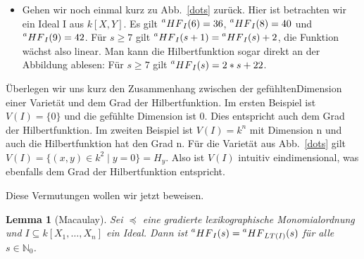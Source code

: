 \documentclass{article}
\newtheorem{lemma}[satz]{Lemma}
\newcommand*{\R}{k[X_{1},\ldots,X_{n}]}
\begin{document}
\begin{itemize}
\begin{proof}[Beweis]
	Damit folgt die Behauptung nach dem Induktionsprinzip.
	\end{proof}
	
	Sei nun \(I = \{0\}\). Dann ist mit Satz~\ref{1.2.8} und dem Theorem aus der Kombinatorik
		\begin{align*}
			\prescript{a}{}{HF}_{I}(s) &= dim_{k}(\R_{\leq s}/I_{\leq s}) \\
			&= dim_{k}(\R_{\leq s}) \\
			&= |\{ X^{\alpha} \in \R\, |\; deg(X^{\alpha}) \leq s\}| \\
			&= |\{ \alpha \in \mathbb{N}^{n}_{0}\, |\; |\alpha| \leq s\}| = |M_{n,s}| \\
			&= \binom{s+n}{s} = \binom{s+n}{n} \\
			&= \frac{1}{n!}(s+n)(s+n-1)\cdots (s+1) \\
			&= \frac{1}{n!}s^{n} + \frac{1}{n!}\binom{n+1}{2}s^{n-1} + \cdots + 1. \\
		\end{align*}
	\item Gehen wir noch einmal kurz zu Abb.~\ref{dots} zurück. Hier ist betrachten wir ein 
	Ideal I aus \(k[X,Y]\). Es gilt \(\prescript{a}{}{HF}_{I}(6) = 36\),
	\(\prescript{a}{}{HF}_{I}(8) = 40\) und \(\prescript{a}{}{HF}_{I}(9) = 42\).
	Für \(s \geq 7\) gilt \(\prescript{a}{}{HF}_{I}(s+1) = \prescript{a}{}{HF}_{I}(s) + 2\),
	die Funktion wächst also linear. Man kann die Hilbertfunktion sogar direkt an der Abbildung
	ablesen: Für \(s \geq 7\) gilt \(\prescript{a}{}{HF}_{I}(s) = 2*s + 22\).
	\end{itemize}

	Überlegen wir uns kurz den Zusammenhang zwischen der \glqq gefühlten\grqq  Dimension einer Varietät und
	dem Grad der Hilbertfunktion. Im ersten Beispiel ist \(V(I) = \{0\}\) und die gefühlte
	Dimension ist 0. Dies entspricht auch dem Grad der Hilbertfunktion. Im zweiten Beispiel ist
	\(V(I) = k^n\) mit Dimension n und auch die Hilbertfunktion hat den Grad n. Für die Varietät 
	aus Abb.~\ref{dots} gilt \(V(I) = \{(x,y) \in k^2\;|\; y = 0\} = H_y\). Also ist \(V(I)\)
	intuitiv eindimensional, was ebenfalls dem Grad der Hilbertfunktion entspricht.

	Diese Vermutungen wollen wir jetzt beweisen.

	\begin{lemma}[Macaulay] \label{1.2.13}
	Sei \(\preceq\) eine gradierte lexikographische Monomialordnung und \(I \subseteq \R\) ein
	Ideal. Dann ist \(\prescript{a}{}{HF}_{I}(s) = \prescript{a}{}{HF}_{LT(I)}(s)\) für alle
	\(s \in \mathbb{N}_{0}\).
	\end{lemma}
\end{document}
